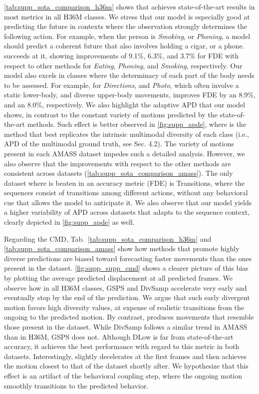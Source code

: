 \documentclass[10pt,twocolumn,letterpaper]{article}
\begin{document}
\autoref{tab:supp_sota_comparison_h36m} shows that \modelname{} achieves state-of-the-art results in most metrics in all H36M classes. We stress that our model is especially good at predicting the future in contexts where the observation strongly determines the following action. For example, when the person is \textit{Smoking}, or \textit{Phoning}, a model should predict a coherent future that also involves holding a cigar, or a phone. \modelname{} succeeds at it, showing improvements of 9.1\%, 6.3\%, and 3.7\% for FDE with respect to other methods for \textit{Eating}, \textit{Phoning}, and \textit{Smoking}, respectively. Our model also excels in classes where the determinacy of each part of the body needs to be assessed. For example, for \textit{Directions}, and \textit{Photo}, which often involve a static lower-body, and diverse upper-body movements, \modelname{} improves FDE by an 8.9\%, and an 8.0\%, respectively. We also highlight the adaptive APD that our model shows, in contrast to the constant variety of motions predicted by the state-of-the-art methods. Such effect is better observed in \autoref{fig:supp_apde}, where \modelname{} is the method that best replicates the intrinsic multimodal diversity of each class (i.e., APD of the multimodal ground truth, see Sec. 4.2).
The variety of motions present in each AMASS dataset impedes such a detailed analysis. However, we also observe that the improvements with respect to the other methods are consistent across datasets (\autoref{tab:supp_sota_comparison_amass}). The only dataset where \modelname{} is beaten in an accuracy metric (FDE) is Transitions, where the sequences consist of transitions among different actions, without any behavioral cue that allows the model to anticipate it. We also observe that our model yields a higher variability of APD across datasets that adapts to the sequence context, clearly depicted in \autoref{fig:supp_apde} as well.




Regarding the CMD, Tab.~\ref{tab:supp_sota_comparison_h36m} and \ref{tab:supp_sota_comparison_amass} show how methods that promote highly diverse predictions are biased toward forecasting faster movements than the ones present in the dataset. \autoref{fig:supp_supp_cmd} shows a clearer picture of this bias by plotting the average predicted displacement at all predicted frames. We observe how in all H36M classes, GSPS and DivSamp accelerate very early and eventually stop by the end of the prediction. We argue that such early divergent motion favors high diversity values, at expense of realistic transitions from the ongoing to the predicted motion. By contrast, \modelname{} produces movements that resemble those present in the dataset. While DivSamp follows a similar trend in AMASS than in H36M, GSPS does not. Although DLow is far from state-of-the-art accuracy, it achieves the best performance with regard to this metric in both datasets. Interestingly, \modelname{} slightly decelerates at the first frames and then achieves the motion closest to that of the dataset shortly after. We hypothesize that this effect is an artifact of the behavioral coupling step, where the ongoing motion smoothly transitions to the predicted behavior.
\end{document}
